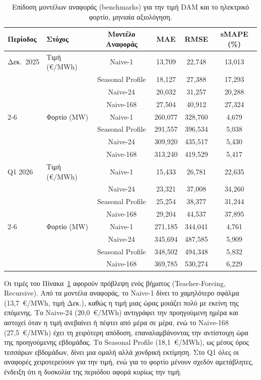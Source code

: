 \begin{table}[H]
  \centering
  \caption{Επίδοση μοντέλων αναφοράς (benchmarks) για την τιμή DAM και το ηλεκτρικό
           φορτίο, μηνιαία αξιολόγηση.}
  \label{tab:benchmarks_performance}
  \small
  \begin{tabular}{llcccc}
    \toprule
    \textbf{Περίοδος} & \textbf{Στόχος} & \textbf{Μοντέλο Αναφοράς} & \textbf{MAE} & \textbf{RMSE} & \textbf{sMAPE (\%)} \\
    \midrule
    Δεκ.\ 2025 & Τιμή (€/MWh) & Naive-1 & 13,709 & 22,748 & 13,013 \\
     & & Seasonal Profile & 18,127 & 27,388 & 17,293 \\
     & & Naive-24 & 20,032 & 31,257 & 20,288 \\
     & & Naive-168 & 27,504 & 40,912 & 27,324 \\
    \cmidrule{2-6}
     & Φορτίο (MW) & Naive-1 & 260,077 & 328,760 & 4,679 \\
     & & Seasonal Profile & 291,557 & 396,534 & 5,038 \\
     & & Naive-24 & 309,920 & 435,517 & 5,430 \\
     & & Naive-168 & 313,240 & 419,529 & 5,417 \\
    \midrule
    Q1 2026 & Τιμή (€/MWh) & Naive-1 & 15,433 & 26,781 & 22,635 \\
     & & Naive-24 & 23,321 & 37,008 & 34,260 \\
     & & Seasonal Profile & 25,254 & 38,377 & 31,244 \\
     & & Naive-168 & 29,204 & 44,537 & 37,895 \\
    \cmidrule{2-6}
     & Φορτίο (MW) & Naive-1 & 271,185 & 344,041 & 4,761 \\
     & & Naive-24 & 345,694 & 487,585 & 5,909 \\
     & & Seasonal Profile & 348,502 & 494,348 & 5,832 \\
     & & Naive-168 & 369,785 & 530,274 & 6,229 \\
    \bottomrule
  \end{tabular}
\end{table}

\noindent Οι τιμές του Πίνακα~\ref{tab:benchmarks_performance} αφορούν πρόβλεψη ενός
βήματος (Teacher-Forcing, Recursive). Από τα μοντέλα αναφοράς, το Naive-1 δίνει το
χαμηλότερο σφάλμα (13,7~€/MWh, τιμή Δεκ.), καθώς η τιμή μιας ώρας μοιάζει πολύ με
εκείνη της επόμενης. Το Naive-24 (20,0~€/MWh) αντιγράφει την προηγούμενη ημέρα και
αστοχεί όταν η τιμή ανεβαίνει ή πέφτει από μέρα σε μέρα, ενώ το Naive-168
(27,5~€/MWh) έχει τη χειρότερη απόδοση, επαναλαμβάνοντας την αντίστοιχη ώρα της
προηγούμενης εβδομάδας. Το Seasonal Profile (18,1~€/MWh), ως μέσος όρος τεσσάρων
εβδομάδων, δίνει μια ομαλή αλλά χονδρική εκτίμηση. Στο Q1 όλες οι αναφορές
χειροτερεύουν για την τιμή, ενώ για το φορτίο μένουν σχεδόν αμετάβλητες, ένδειξη ότι
η δυσκολία της περιόδου αφορά κυρίως την τιμή.


